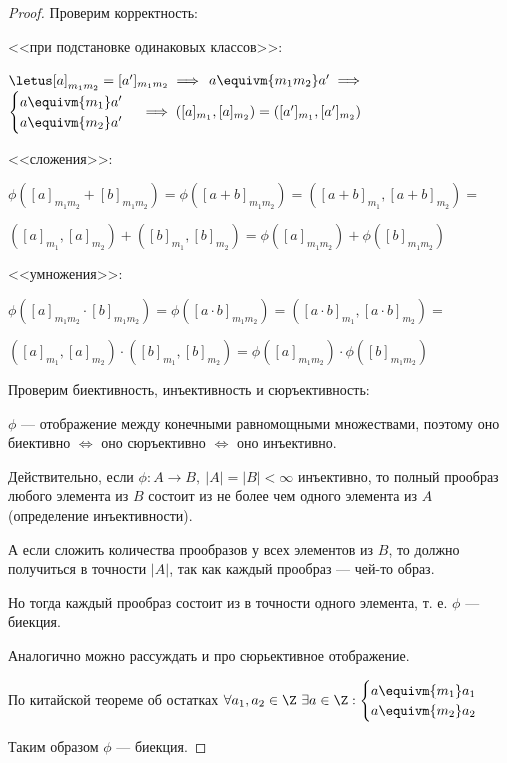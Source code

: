 \begin{proof}
    
    Проверим корректность:
    
    <<при подстановке одинаковых классов>>:

    $\letus [a]_{m_1m_2} = [a']_{m_1m_2} \implies$
    $a \equivm{m_1m_2} a' \implies$
    $\begin{cases}
        a \equivm{m_1} a' \\
        a \equivm{m_2} a'
    \end{cases} \implies ([a]_{m_1}, [a]_{m_2}) = ([a']_{m_1}, [a']_{m_2})$

    <<сложения>>:
    
    $\phi([a]_{m_1m_2} + [b]_{m_1m_2}) = \phi([a + b]_{m_1m_2}) = ([a + b]_{m_1}, [a + b]_{m_2}) = $
    
    $([a]_{m_1}, [a]_{m_2}) + ([b]_{m_1}, [b]_{m_2}) = \phi([a]_{m_1m_2}) + \phi([b]_{m_1m_2})$
    
    <<умножения>>:
    
    $\phi([a]_{m_1m_2} \cdot [b]_{m_1m_2}) = \phi([a \cdot b]_{m_1m_2}) = ([a \cdot b]_{m_1}, [a \cdot b]_{m_2}) = $
    
    $([a]_{m_1}, [a]_{m_2}) \cdot ([b]_{m_1}, [b]_{m_2}) = \phi([a]_{m_1m_2}) \cdot \phi([b]_{m_1m_2})$
    
    Проверим биективность, инъективность и сюръективность:

    $\phi$ --- отображение между конечными равномощными множествами, поэтому оно биективно $\iff$ оно сюръективно $\iff$ оно инъективно.

    Действительно, если $\phi: A \to B,~ |A| = |B| < \infty$ инъективно, 
    то полный прообраз любого элемента из $B$ состоит из не более чем одного элемента из $A$ (определение инъективности). 

    А если сложить количества прообразов у всех элементов из $B$, то должно получиться в точности $|A|$, так как каждый прообраз --- чей-то образ. 

    Но тогда каждый прообраз состоит из в точности одного элемента, т. е. $\phi$ --- биекция. 
    
    Аналогично можно рассуждать и про сюрьективное отображение.

    По китайской теореме об остатках $\forall a_1, a_2 \in \Z~ \exists a \in \Z: 
    \begin{cases}
        a \equivm{m_1} a_1 \\
        a \equivm{m_2} a_2 \\
    \end{cases}$

    Таким образом $\phi$ --- биекция.
\end{proof}


